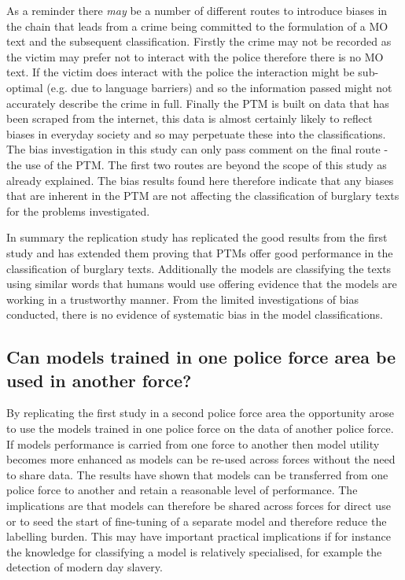As a reminder there \emph{may} be a number of different routes to introduce biases in the chain that leads from a crime being committed to the formulation of a MO text and the subsequent classification. Firstly the crime may not be recorded as the victim may prefer not to interact with the police therefore there is no MO text. If the victim does interact with the police the interaction might be sub-optimal (e.g. due to language barriers) and so the information passed might not accurately describe the crime in full. Finally the PTM is built on data that has been scraped from the internet, this data is almost certainly likely to reflect biases in everyday society and so may perpetuate these into the classifications. The bias investigation in this study can only pass comment on the final route - the use of the PTM. The first two routes are beyond the scope of this study as already explained. The bias results found here therefore indicate that any biases that are inherent in the PTM are not affecting the classification of burglary texts for the problems investigated. 

In summary the replication study has replicated the good results from the first study and has extended them proving that PTMs offer good performance in the classification of burglary texts. Additionally the models are classifying the texts using similar words that humans would use offering evidence that the models are working in a trustworthy manner. From the limited investigations of bias conducted, there is no evidence of systematic bias in the model classifications.


\subsection{Can models trained in one police force area be used in another force?} By replicating the first study in a second police force area the opportunity arose to use the models trained in one police force on the data of another police force. If models performance is carried from one force to another then model utility becomes more enhanced as models can be re-used across forces without the need to share data. The results have shown that models can be transferred from one police force to another and retain a reasonable level of performance. The implications are that models can therefore be shared across forces for direct use or to seed the start of fine-tuning of a separate model and therefore reduce the labelling burden. This may have important practical implications if for instance the knowledge for classifying a model is relatively specialised, for example the detection of modern day slavery. 

